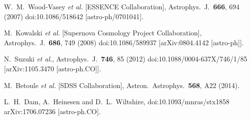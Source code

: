 \documentclass[nofootinbib,twocolumn]{revtex4}
\begin{document}
\begin{thebibliography}{99}
  
  W.~M.~Wood-Vasey {\it et al.} [ESSENCE Collaboration],
  Astrophys.\ J.\  {\bf 666}, 694 (2007)
  doi:10.1086/518642
  [astro-ph/0701041].

  M.~Kowalski {\it et al.} [Supernova Cosmology Project Collaboration],
  Astrophys.\ J.\  {\bf 686}, 749 (2008)
  doi:10.1086/589937
  [arXiv:0804.4142 [astro-ph]].
 

  N.~Suzuki {\it et al.},
  Astrophys.\ J.\  {\bf 746}, 85 (2012)
  doi:10.1088/0004-637X/746/1/85
  [arXiv:1105.3470 [astro-ph.CO]].






  M.~Betoule {\it et al.} [SDSS Collaboration],
  Astron.\ Astrophys.\  {\bf 568}, A22 (2014).



  L.~H.~Dam, A.~Heinesen and D.~L.~Wiltshire,
  doi:10.1093/mnras/stx1858
  arXiv:1706.07236 [astro-ph.CO].



\end{thebibliography}
\end{document}
